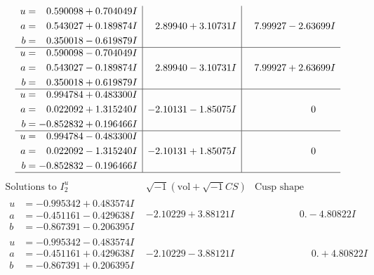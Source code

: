 \documentclass[1p]{elsarticle_modified}
\theoremstyle{definition}
\newcommand{\I}{\sqrt{-1}}
\begin{document}
$$\begin{array}{c|c|c}
\begin{aligned}
u &= \phantom{-}0.590098 + 0.704049 I \\
a &= \phantom{-}0.543027 + 0.189874 I \\
b &= \phantom{-}0.350018 - 0.619879 I\end{aligned}
 & \phantom{-}2.89940 + 3.10731 I & \phantom{-}7.99927 - 2.63699 I \\ \hline\begin{aligned}
u &= \phantom{-}0.590098 - 0.704049 I \\
a &= \phantom{-}0.543027 - 0.189874 I \\
b &= \phantom{-}0.350018 + 0.619879 I\end{aligned}
 & \phantom{-}2.89940 - 3.10731 I & \phantom{-}7.99927 + 2.63699 I \\ \hline\begin{aligned}
u &= \phantom{-}0.994784 + 0.483300 I \\
a &= \phantom{-}0.022092 + 1.315240 I \\
b &= -0.852832 + 0.196466 I\end{aligned}
 & -2.10131 - 1.85075 I & \phantom{-0.000000 } 0 \\ \hline\begin{aligned}
u &= \phantom{-}0.994784 - 0.483300 I \\
a &= \phantom{-}0.022092 - 1.315240 I \\
b &= -0.852832 - 0.196466 I\end{aligned}
 & -2.10131 + 1.85075 I & \phantom{-0.000000 } 0\\
 \hline 
 \end{array}$$\newpage$$\begin{array}{c|c|c}  
\text{Solutions to }I^u_{2}& \I (\text{vol} + \sqrt{-1}CS) & \text{Cusp shape}\\
 \hline 
\begin{aligned}
u &= -0.995342 + 0.483574 I \\
a &= -0.451161 - 0.429638 I \\
b &= -0.867391 - 0.206395 I\end{aligned}
 & -2.10229 + 3.88121 I & \phantom{-0.000000 } 0. - 4.80822 I \\ \hline\begin{aligned}
u &= -0.995342 - 0.483574 I \\
a &= -0.451161 + 0.429638 I \\
b &= -0.867391 + 0.206395 I\end{aligned}
 & -2.10229 - 3.88121 I & \phantom{-0.000000 -}0. + 4.80822 I \\ \hline\begin{aligned}

\end{aligned}
\end{array}$$
\end{document}
